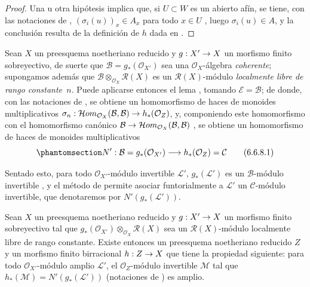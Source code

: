 \documentclass[oneside,10pt]{amsart}
\makeatletter
\newcommand{\ega@arrow}[2]{\mathchoice{#1}{#2}{#2}{#2}}
\renewcommand{\to}{\ega@arrow{\longrightarrow}{\rightarrow}}
\let\EGAOriginalLabel\label
\renewcommand{\label}[1]{\phantomsection\EGAOriginalLabel{#1}}
\makeatother
\begin{document}
\begin{proof}
Una u otra hipótesis implica que, si $U\subset W$ es un abierto afín, se tiene, con las notaciones de ,
$(\sigma_i(u))_x\in A_x$
para todo $x\in U$ , luego $\sigma_i(u)\in A$, y la conclusión resulta de la definición de $h$ dada en .
\end{proof}

\begin{env}[6.6.8]
\label{II.6.6.8-fr}
Sean $X$ un preesquema noetheriano reducido y $g:X'\to X$ un morfismo finito sobreyectivo, de suerte que $\mathcal{B}=g_*(\mathcal{O}_{X'})$ sea una $\mathcal{O}_X$-álgebra \emph{coherente};
supongamos además que $\mathcal{B}\otimes_{\mathcal{O}_X}\mathcal{R}(X)$ es un $\mathcal{R}(X)$-módulo \emph{localmente libre de rango constante~$n$}.
Puede aplicarse entonces el lema , tomando $\mathcal{E}=\mathcal{B}$;
de donde, con las notaciones de , se obtiene un homomorfismo de haces de monoides multiplicativos
$\sigma_n:\mathcal{H}om_{\mathcal{O}_X}(\mathcal{B},\mathcal{B})
\to h_*(\mathcal{O}_Z)$,
y, componiendo este homomorfismo con el homomorfismo canónico
$\mathcal{B}\to
\mathcal{H}om_{\mathcal{O}_X}(\mathcal{B},\mathcal{B})$
, se obtiene un homomorfismo de haces de monoides multiplicativos
\[
\label{II.6.6.8.1-fr}
N':\mathcal{B}=g_*(\mathcal{O}_{X'})\longrightarrow
h_*(\mathcal{O}_Z)=\mathcal{C}
\tag{6.6.8.1}
\]

Sentado esto, para todo $\mathcal{O}_{X'}$-módulo invertible $\mathcal{L}'$, $g_*(\mathcal{L}')$ es un $\mathcal{B}$-módulo invertible , y el método de  permite asociar funtorialmente a $\mathcal{L}'$ un $\mathcal{C}$-módulo invertible, que denotaremos por
$N'(g_*(\mathcal{L}'))$.
\end{env}

\begin{lemma}[6.6.9]
\label{II.6.6.9-fr}
Sean $X$ un preesquema noetheriano reducido y $g:X'\to X$ un morfismo finito sobreyectivo tal que
$g_*(\mathcal{O}_{X'})\otimes_{\mathcal{O}_X}\mathcal{R}(X)$
sea un $\mathcal{R}(X)$-módulo localmente libre de rango constante.
Existe entonces un preesquema noetheriano reducido $Z$ y un morfismo finito birracional $h:Z\to X$ que tiene la propiedad siguiente: para todo $\mathcal{O}_{X'}$-módulo amplio $\mathcal{L}'$, el $\mathcal{O}_Z$-módulo invertible $\mathcal{M}$ tal que
$h_*(\mathcal{M})=N'(g_*(\mathcal{L}'))$
\textup{(notaciones de )} es amplio.
\end{lemma}
\end{document}
